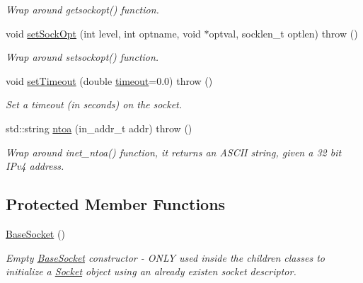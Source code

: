 \begin{CompactItemize}
\begin{CompactList}\small\item\em Wrap around getsockopt() function. \item\end{CompactList}\item 
void \hyperlink{classusock_1_1BaseSocket_d0444de98899e9312bfa320d5a359e07}{setSockOpt} (int level, int optname, void $\ast$optval, socklen\_\-t optlen)  throw ()
\begin{CompactList}\small\item\em Wrap around setsockopt() function. \item\end{CompactList}\item 
void \hyperlink{classusock_1_1BaseSocket_e31552b42df68bc68fe557caf6e75128}{setTimeout} (double \hyperlink{classusock_1_1BaseSocket_b419e8fd0b849c74b73a02d6bd9081e3}{timeout}=0.0)  throw ()
\begin{CompactList}\small\item\em Set a timeout (in seconds) on the socket. \item\end{CompactList}\item 
std::string \hyperlink{classusock_1_1BaseSocket_3da108b8c23df3b521ded0bc4ae5295c}{ntoa} (in\_\-addr\_\-t addr)  throw ()
\begin{CompactList}\small\item\em Wrap around inet\_\-ntoa() function, it returns an ASCII string, given a 32 bit IPv4 address. \item\end{CompactList}\end{CompactItemize}
\subsection*{Protected Member Functions}
\begin{CompactItemize}
\item 
\hyperlink{classusock_1_1BaseSocket_20f598433d6c3a97656f0179f7371218}{BaseSocket} ()
\begin{CompactList}\small\item\em Empty \hyperlink{classusock_1_1BaseSocket}{BaseSocket} constructor - ONLY used inside the children classes to initialize a \hyperlink{classusock_1_1Socket}{Socket} object using an already existen socket descriptor. \item\end{CompactList}\end{CompactItemize}
